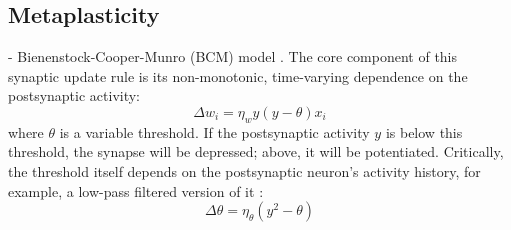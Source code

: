 \documentclass{article}
\theoremstyle{definition} \newtheorem{definition}{Definition}
\theoremstyle{remark} \newtheorem{remark}{Remark}
\newcounter{ct}
\begin{document}
\subsection{Metaplasticity}
 - Bienenstock-Cooper-Munro (BCM) model \cite{bienenstock1982theory}. The core component of this synaptic update rule is its non-monotonic, time-varying dependence on the postsynaptic activity:  
\begin{equation}
    \Delta w_i = \eta_w y (y - \theta) x_i
\end{equation}
where $\theta$ is a variable threshold. If the postsynaptic activity $y$ is below this threshold, the synapse will be depressed; above, it will be potentiated. Critically, the threshold itself depends on the postsynaptic neuron’s activity history, for example, a low-pass filtered version of it \cite[Ch.~8.2]{dayan2005theoretical}:  
\begin{equation}
    \Delta \theta = \eta_\theta (y^2 - \theta)
\end{equation}
\end{document}
